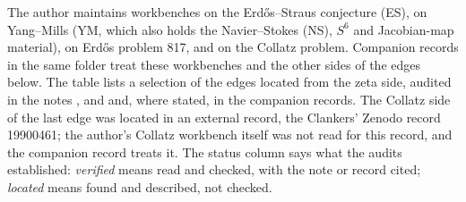 The author maintains workbenches on the Erdős--Straus conjecture (ES), on Yang--Mills (YM, which also holds the Navier--Stokes (NS), $S^6$ and Jacobian-map material), on Erdős problem 817, and on the Collatz problem. Companion records in the same folder treat these workbenches and the other sides of the edges below. The table lists a selection of the edges located from the zeta side, audited in the notes ,  and  and, where stated, in the companion records. The Collatz side of the last edge was located in an external record, the Clankers' Zenodo record 19900461; the author's Collatz workbench itself was not read for this record, and the companion record treats it. The status column says what the audits established: \emph{verified} means read and checked, with the note or record cited; \emph{located} means found and described, not checked.


